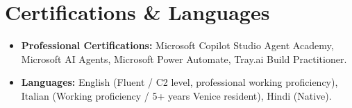 \documentclass[10pt,a4paper]{article}
\begin{document}
\section{Certifications \& Languages}
\begin{itemize}[leftmargin=1.2em]
    \item \textbf{Professional Certifications:} Microsoft Copilot Studio Agent Academy, Microsoft AI Agents, Microsoft Power Automate, Tray.ai Build Practitioner.
    \item \textbf{Languages:} English (Fluent / C2 level, professional working proficiency), Italian (Working proficiency / 5+ years Venice resident), Hindi (Native).
\end{itemize}
\end{document}
